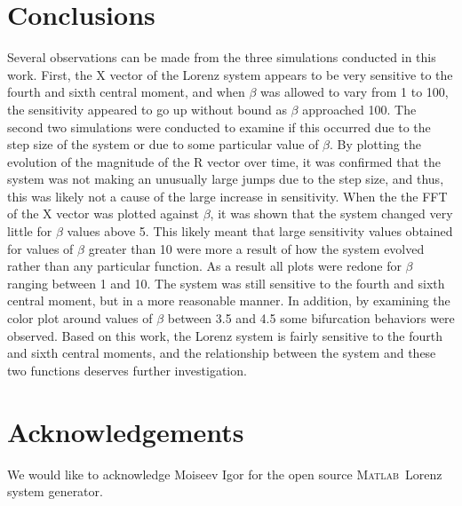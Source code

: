 \documentclass{article}[11pt]
\newcommand{\Matlab}{\textsc{Matlab}}
\begin{document}
\section{Conclusions}
\label{sec:conclusion}
Several observations can be made from the three simulations conducted in this work.  First, the X vector of the Lorenz system appears to be very sensitive to the fourth and sixth central moment, and when $\beta$ was allowed to vary from 1 to 100, the sensitivity appeared to go up without bound as $\beta$ approached 100.  The second two simulations were conducted to examine if this occurred due to the step size of the system or due to some particular value of $\beta$.  By plotting the evolution of the magnitude of the R vector over time, it was confirmed that the system was not making an unusually large jumps due to the step size, and thus, this was likely not a cause of the large increase in sensitivity.  When the the FFT of the X vector was plotted against $\beta$, it was shown that the system changed very little for $\beta$ values above 5.  This likely meant that large sensitivity values obtained for values of $\beta$ greater than 10 were more a result of how the system evolved rather than any particular function.  As a result all plots were redone for $\beta$ ranging between 1 and 10.  The system was still sensitive to the fourth and sixth central moment, but in a more reasonable manner.  In addition, by examining the color plot around values of $\beta$ between 3.5 and 4.5 some bifurcation behaviors were observed.  Based on this work, the Lorenz system is fairly sensitive to the fourth and sixth central moments, and the relationship between the system and these two functions deserves further investigation.

\section{Acknowledgements}
\label{sec:Ack}
We would like to acknowledge Moiseev Igor for the open source \Matlab \ Lorenz system generator.




\end{document}

